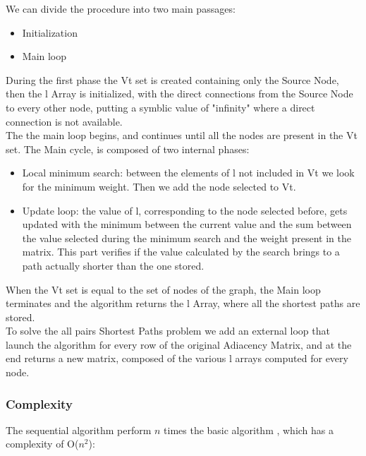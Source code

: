 \documentclass[
	a4paper, %
	12pt, %
]{class}
\begin{document}
We can divide the procedure into two main passages:\\
\begin{itemize}
    \item Initialization
    \item Main loop\\
\end{itemize}

During the first phase the Vt set is created containing only the Source Node, then the l Array is initialized, with the direct connections
from the Source Node to every other node, putting a symblic value of "infinity" where a direct connection is not available.\\

The the main loop begins, and continues until all the nodes are present in the Vt set. The Main cycle, is composed of two internal phases:\\
\begin{itemize}
    \item Local minimum search: between the elements of l not included in Vt we look for the minimum weight. Then we add the node selected to Vt.
    \item Update loop: the value of l, corresponding to the node selected before, gets updated with the minimum between the current value and the sum
    between the value selected during the minimum search and the weight present in the matrix. This part verifies if the value calculated by the search
    brings to a path actually shorter than the one stored.\\
\end{itemize}

When the Vt set is equal to the set of nodes of the graph, the Main loop terminates and the algorithm returns the l Array, 
where all the shortest paths are stored.\\

To solve the all pairs Shortest Paths problem we add an external loop that launch the algorithm for every row of the original Adiacency Matrix,
and at the end returns a new matrix, composed of the various l arrays computed for every node.

\subsubsection{Complexity}
The sequential algorithm perform $n$ times the basic algorithm , which has a complexity of O($n^2$):\\
\end{document}
